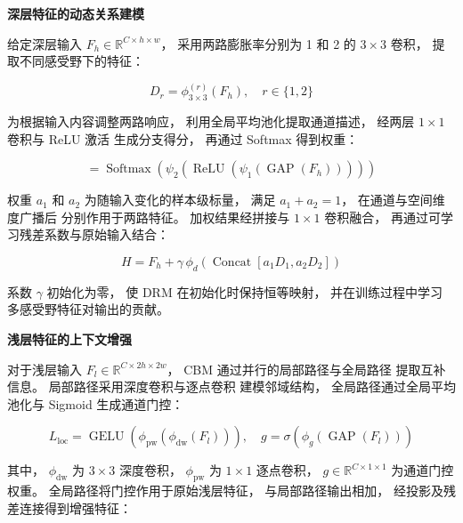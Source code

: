 \noindent\textbf{深层特征的动态关系建模}\par

给定深层输入
\(F_h\in\mathbb{R}^{C\times h\times w}\)，
采用两路膨胀率分别为 1 和 2 的
\(3\times3\) 卷积，
提取不同感受野下的特征：

\begin{equation}
D_r=\phi_{3\times3}^{(r)}(F_h),\quad r\in\{1,2\}
\label{eq:drcf-dilated}
\end{equation}

为根据输入内容调整两路响应，
利用全局平均池化提取通道描述，
经两层 \(1\times1\) 卷积与 ReLU 激活
生成分支得分，
再通过 Softmax 得到权重：

\begin{equation}
[a_1,a_2]=\operatorname{Softmax}\left(
\psi_2\left(
\operatorname{ReLU}\left(
\psi_1(\operatorname{GAP}(F_h))
\right)\right)\right)
\label{eq:drcf-branch-weights}
\end{equation}

权重 \(a_1\) 和 \(a_2\)
为随输入变化的样本级标量，
满足 \(a_1+a_2=1\)，
在通道与空间维度广播后
分别作用于两路特征。
加权结果经拼接与 \(1\times1\) 卷积融合，
再通过可学习残差系数与原始输入结合：

\begin{equation}
H=F_h+\gamma\,\phi_d\left(
\operatorname{Concat}[a_1D_1,a_2D_2]
\right)
\label{eq:drcf-drm-output}
\end{equation}

系数 \(\gamma\) 初始化为零，
使 DRM 在初始化时保持恒等映射，
并在训练过程中学习
多感受野特征对输出的贡献。

\noindent\textbf{浅层特征的上下文增强}\par

对于浅层输入
\(F_l\in\mathbb{R}^{C\times2h\times2w}\)，
CBM 通过并行的局部路径与全局路径
提取互补信息。
局部路径采用深度卷积与逐点卷积
建模邻域结构，
全局路径通过全局平均池化与 Sigmoid
生成通道门控：

\begin{equation}
L_{\mathrm{loc}}=\operatorname{GELU}\left(
\phi_{\mathrm{pw}}(\phi_{\mathrm{dw}}(F_l))
\right),\quad
g=\sigma\left(
\phi_g(\operatorname{GAP}(F_l))
\right)
\label{eq:drcf-local-global}
\end{equation}

其中，
\(\phi_{\mathrm{dw}}\) 为 \(3\times3\) 深度卷积，
\(\phi_{\mathrm{pw}}\) 为 \(1\times1\) 逐点卷积，
\(g\in\mathbb{R}^{C\times1\times1}\)
为通道门控权重。
全局路径将门控作用于原始浅层特征，
与局部路径输出相加，
经投影及残差连接得到增强特征：

